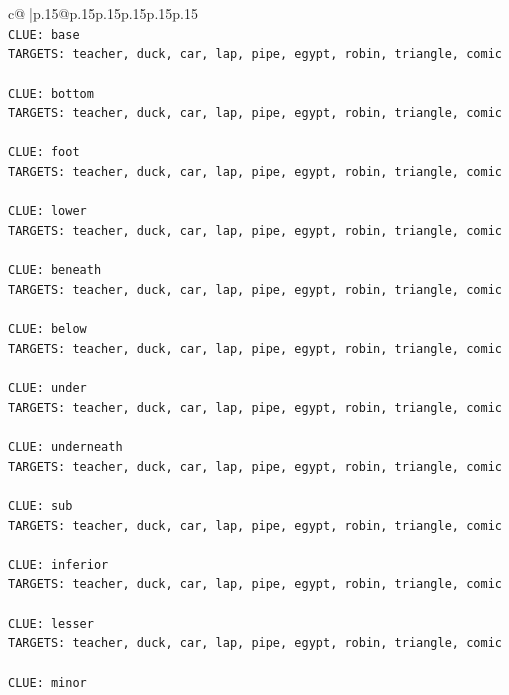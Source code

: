 \documentclass{article}
\begin{document}
{\begin{supertabular}{c@{$\;$}|p{.15\linewidth}@{}p{.15\linewidth}p{.15\linewidth}p{.15\linewidth}p{.15\linewidth}p{.15\linewidth}}
{{{\\ 
\texttt{CLUE: base} \\
\texttt{TARGETS: teacher, duck, car, lap, pipe, egypt, robin, triangle, comic} \\
\\ 
\texttt{CLUE: bottom} \\
\texttt{TARGETS: teacher, duck, car, lap, pipe, egypt, robin, triangle, comic} \\
\\ 
\texttt{CLUE: foot} \\
\texttt{TARGETS: teacher, duck, car, lap, pipe, egypt, robin, triangle, comic} \\
\\ 
\texttt{CLUE: lower} \\
\texttt{TARGETS: teacher, duck, car, lap, pipe, egypt, robin, triangle, comic} \\
\\ 
\texttt{CLUE: beneath} \\
\texttt{TARGETS: teacher, duck, car, lap, pipe, egypt, robin, triangle, comic} \\
\\ 
\texttt{CLUE: below} \\
\texttt{TARGETS: teacher, duck, car, lap, pipe, egypt, robin, triangle, comic} \\
\\ 
\texttt{CLUE: under} \\
\texttt{TARGETS: teacher, duck, car, lap, pipe, egypt, robin, triangle, comic} \\
\\ 
\texttt{CLUE: underneath} \\
\texttt{TARGETS: teacher, duck, car, lap, pipe, egypt, robin, triangle, comic} \\
\\ 
\texttt{CLUE: sub} \\
\texttt{TARGETS: teacher, duck, car, lap, pipe, egypt, robin, triangle, comic} \\
\\ 
\texttt{CLUE: inferior} \\
\texttt{TARGETS: teacher, duck, car, lap, pipe, egypt, robin, triangle, comic} \\
\\ 
\texttt{CLUE: lesser} \\
\texttt{TARGETS: teacher, duck, car, lap, pipe, egypt, robin, triangle, comic} \\
\\ 
\texttt{CLUE: minor} \\
}}}
\end{supertabular}}
\end{document}
